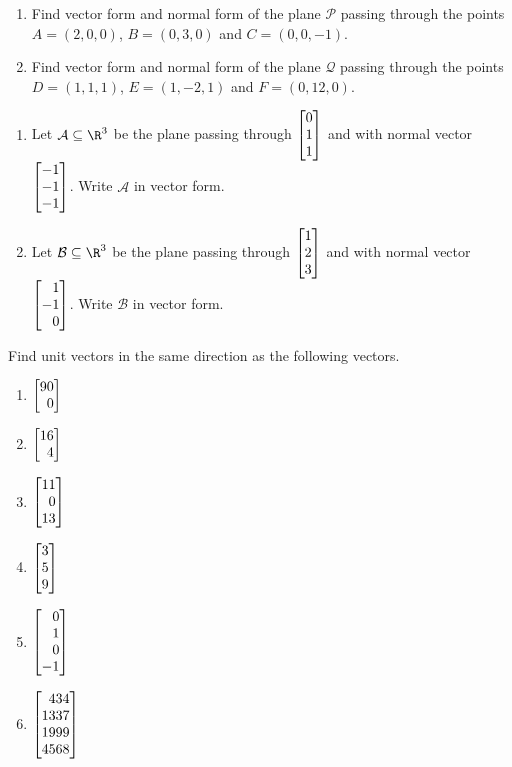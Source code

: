\begin{exercises}
\begin{problist}
		\prob
		\begin{enumerate}
			\item Find vector form and normal form of the plane $\mathcal P$ passing
			through the points $A=(2,0,0)$, $B=(0,3,0)$ and $C=(0,0,-1)$.
			\item Find vector form and normal form of the plane $\mathcal Q$ passing
			through the points $D=(1,1,1)$, $E=(1,-2,1)$ and $F=(0,12,0)$.
		\end{enumerate}

		\prob
		\begin{enumerate}
			\item Let $\mathcal A\subseteq \R^3$ be the plane passing through $\mat{0\\1\\1}$
			and with normal vector $\mat{-1\\-1\\-1}$. Write $\mathcal A$ in vector form.
			\item Let $\mathcal B\subseteq \R^3$ be the plane passing through $\mat{1\\2\\3}$
			and with normal vector $\mat{1\\-1\\0}$. Write $\mathcal B$ in vector form.
		\end{enumerate}

		\prob Find unit vectors in the same direction as the following vectors.
		\begin{enumerate}
			\item $\mat{90\\0}$
			\item $\mat{16\\4}$
			\item $\mat{11\\0\\13}$
			\item $\mat{3\\5\\9}$
			\item $\mat{0\\1\\0\\-1}$
			\item $\mat{434\\1337\\1999\\4568}$
		\end{enumerate}


\end{problist}
\end{exercises}
